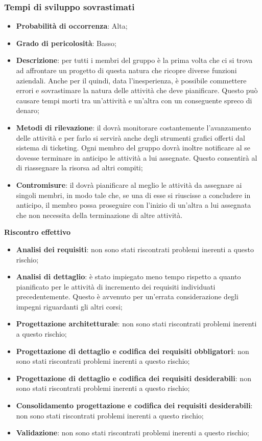 		\subsubsection{Tempi di sviluppo sovrastimati} %
		\label{ssub:tempi_di_sviluppo_sovrastimati}
			\begin{itemize}
				\item \textbf{Probabilità di occorrenza}: Alta;
				\item \textbf{Grado di pericolosità}: Basso;
				\item \textbf{Descrizione}: per tutti i membri del gruppo è la prima volta che ci si trova ad affrontare un progetto di questa natura che ricopre diverse funzioni aziendali. Anche per il \roleProjectManager{} quindi, data l'inesperienza, è possibile commettere errori e sovrastimare la natura delle attività che deve pianificare. Questo può causare tempi morti tra un'attività e un'altra con un conseguente spreco di denaro;
				\item \textbf{Metodi di rilevazione}: il \roleProjectManager{} dovrà monitorare costantemente l'avanzamento delle attività e per farlo si servirà anche degli strumenti grafici offerti dal sistema di ticketing. Ogni membro del gruppo dovrà inoltre notificare al \roleProjectManager{} se dovesse terminare in anticipo le attività a lui assegnate. Questo consentirà al \roleProjectManager{} di riassegnare la risorsa ad altri compiti;
				\item \textbf{Contromisure}: il \roleProjectManager{} dovrà pianificare al meglio le attività da assegnare ai singoli membri, in modo tale che, se una di esse si riuscisse a concludere in anticipo, il membro possa proseguire con l'inizio di un'altra a lui assegnata che non necessita della terminazione di altre attività.
			\end{itemize}
		\noindent
		\textbf{Riscontro effettivo}
			\begin{itemize}
				\item \textbf{Analisi dei requisiti}: non sono stati riscontrati problemi inerenti a questo rischio;
				\item \textbf{Analisi di dettaglio}: è stato impiegato meno tempo rispetto a quanto pianificato per le attività di incremento dei requisiti individuati precedentemente. Questo è avvenuto per un'errata considerazione degli impegni riguardanti gli altri corsi;
				\item \textbf{Progettazione architetturale}: non sono stati riscontrati problemi inerenti a questo rischio;
				\item \textbf{Progettazione di dettaglio e codifica dei requisiti obbligatori}: non sono stati riscontrati problemi inerenti a questo rischio;
				\item \textbf{Progettazione di dettaglio e codifica dei requisiti desiderabili}: non sono stati riscontrati problemi inerenti a questo rischio;
				\item \textbf{Consolidamento progettazione e codifica dei requisiti desiderabili}: non sono stati riscontrati problemi inerenti a questo rischio;
				\item \textbf{Validazione}: non sono stati riscontrati problemi inerenti a questo rischio;
			\end{itemize}


